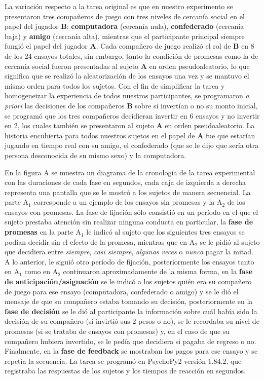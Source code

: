 \documentclass[]{article}
\begin{document}
La variación respecto a la tarea original es que en nuestro experimento
se presentaron tres compañeros de juego con tres niveles de cercanía
social en el papel del jugador \textbf{B}: \textbf{computadora}
(cercanía nula), \textbf{confederado} (cercanía baja) y \textbf{amigo}
(cercanía alta), mientras que el participante principal siempre fungió
el papel del jugador \textbf{A}. Cada compañero de juego realizó el rol
de \textbf{B} en 8 de los 24 ensayos totales, sin embargo, tanto la
condición de promesas como la de cercanía social fueron presentadas al
sujeto \textbf{A} en orden pseudoaleatorio, lo que significa que se
realizó la aleatorización de los ensayos una vez y se mantuvo el mismo
orden para todos los sujetos. Con el fin de simplificar la tarea y
homogeneizar la experiencia de todos nuestros participantes, se
programaron \emph{a priori} las decisiones de los compañeros \textbf{B}
sobre si invertían o no su monto inicial, se programó que los tres
compañeros decidieran invertir en 6 ensayos y no invertir en 2, los
cuales también se presentaron al sujeto \textbf{A} en orden
pseudoaleatorio. La historia encubierta para todos nuestros sujetos en
el papel de \textbf{A} fue que estarían jugando en tiempo real con su
amigo, el confederado (que se le dijo que sería otra persona desconocida
de su mismo sexo) y la computadora.

En la figura A se muestra un diagrama de la cronología de la tarea
experimental con las duraciones de cada fase en segundos, cada caja de
izquierda a derecha representa una pantalla que se le mostró a los
sujetos de manera secuencial. La parte A\(_{1}\) corresponde a un
ejemplo de los ensayos sin promesas y la A\(_{2}\) de los ensayos con
promesas. La fase de fijación sólo consistió en un período en el que el
sujeto prestaba atención sin realizar ninguna conducta en particular, la
\textbf{fase de promesas} en la parte A\(_{1}\) le indicó al sujeto que
los siguientes tres ensayos se podían decidir sin el efecto de la
promesa, mientras que en A\(_{2}\) se le pidió al sujeto que decidiera
entre \emph{siempre}, \emph{casi siempre}, \emph{algunas veces} o
\emph{nunca} pagar la mitad. A lo anterior, le siguió otro período de
fijación, posteriormente los ensayos tanto en A\(_{1}\) como en
A\(_{2}\) continuaron aproximadamente de la misma forma, en la
\textbf{fase de anticipación/asignación} se le indicó a los sujetos
quién era su compañero de juego para ese ensayo (computadora,
confederado o amigo) y se le dió el mensaje de que su compañero estaba
tomando su decisión, posteriormente en la \textbf{fase de decisión} se
le dió al participante la información sobre cuál había sido la decisión
de su compañero (si invirtió sus 2 pesos o no), se le recordaba su nivel
de promesas (si se trataba de ensayos con promesas) y, en el caso de que
su compañero hubiera invertido, se le pedía que decidiera si pagaba de
regreso o no. Finalmente, en la \textbf{fase de feedback} se mostraban
los pagos para ese ensayo y se repetía la secuencia. La tarea se
programó en PsychoPy2 versión 1.84.2, que registraba las respuestas de
los sujetos y los tiempos de reacción en segundos.
\end{document}
